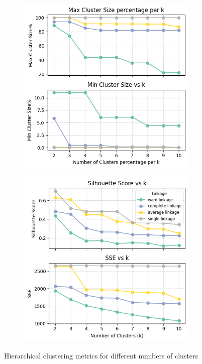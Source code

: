 \begin{figure}[H]
    \centering
    \begin{subfigure}[t]{0.49\textwidth}
        \centering
        \includegraphics[width=0.95\textwidth]{plots/max_min_pctg.png}
        \label{fig:max_min_pctg}
    \end{subfigure}
    \hfill
    \begin{subfigure}[t]{0.49\textwidth}
        \centering
        \includegraphics[width=0.95\textwidth]{plots/sil_sse_hierarchical_clust.png}
        \label{fig:sil_sse_hierarchical_clust}
    \end{subfigure}
    \caption{Hierarchical clustering metrics for different numbers of clusters}
    \label{fig:hier_clust_stats}
\end{figure}

